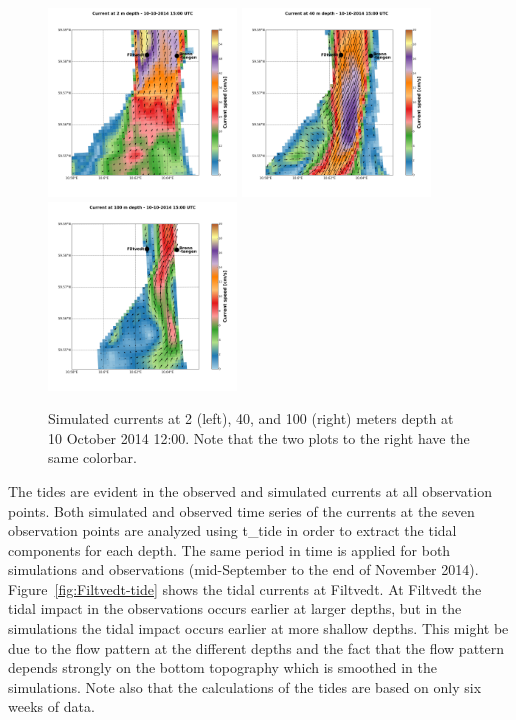 \begin{figure}[ht]
\centerline{
\includegraphics*[trim=2cm 3cm 1cm 3.3cm,clip=true,height=5cm]{Figurer/Filtvedt_t4611_z2_current}
\includegraphics*[trim=3.8cm 3cm 6cm 3.3cm,clip=true,height=5cm]{Figurer/Filtvedt_t4611_z40_current}
\includegraphics*[trim=3.8cm 3cm 1cm 3.3cm,clip=true,height=5cm]{Figurer/Filtvedt_t4611_z100_current}}
\caption{\small
Simulated currents at 2 (left), 40, and 100 (right) meters depth at 10 October 2014 12:00. Note that the two plots to the right have the same colorbar.}
\label{fig:Filtvedt-simcur}
\end{figure}

The tides are evident in the observed and simulated currents at all observation points. Both simulated and observed time series of the currents at the seven observation points are analyzed using t\_tide \cite{pavlo:etal:2002} in order to extract the tidal components for each depth. The same period in time is applied for both simulations and observations (mid-September to the end of November 2014). Figure~\ref{fig:Filtvedt-tide} shows the tidal currents at Filtvedt. At Filtvedt the tidal impact in the observations occurs earlier at larger depths, but in the simulations the tidal impact occurs earlier at more shallow depths. This might be due to the flow pattern at the different depths and the fact that the flow pattern depends strongly on the bottom topography which is smoothed in the simulations. Note also that the calculations of the tides are based on only six weeks of data.



